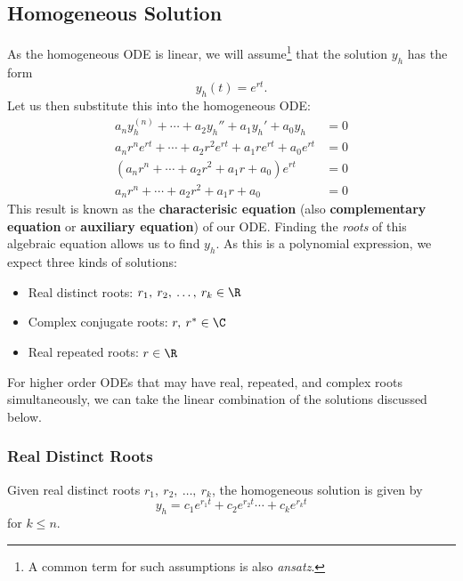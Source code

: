\documentclass{article}
\begin{document}
\subsection{Homogeneous Solution}
As the homogeneous ODE is linear, we will assume\footnote{A common term for such assumptions is also \emph{ansatz}.} that the solution \(y_h\) has the form
\begin{equation*}
    y_h\left( t \right) = e^{r t}.
\end{equation*}
Let us then substitute this into the homogeneous ODE:
\begin{align*}
    a_n y_h^{\left( n \right)} + \cdots + a_2 y_h'' + a_1 y_h' + a_0 y_h     & = 0 \\
    a_n r^n e^{r t} + \cdots + a_2 r^2 e^{r t} + a_1 r e^{r t} + a_0 e^{r t} & = 0 \\
    \left( a_n r^n + \cdots + a_2 r^2 + a_1 r + a_0 \right) e^{r t}          & = 0 \\
    a_n r^n + \cdots + a_2 r^2 + a_1 r + a_0                                 & = 0
\end{align*}
This result is known as the \textbf{characterisic equation} (also \textbf{complementary equation} or \textbf{auxiliary equation}) of our ODE.
Finding the \emph{roots} of this algebraic equation allows us to find \(y_h\).
As this is a polynomial expression, we expect three kinds of solutions:
\begin{itemize}
    \item Real distinct roots: \(r_1,\: r_2,\: \dots,\: r_k \in \R\)
    \item Complex conjugate roots: \(r,\: r^\ast \in \C\)
    \item Real repeated roots: \(r \in \R\)
\end{itemize}
For higher order ODEs that may have real, repeated, and complex roots simultaneously, we can take the linear combination
of the solutions discussed below.
\subsubsection{Real Distinct Roots}
Given real distinct roots \(r_1,\: r_2,\: \dots,\: r_k\), the homogeneous solution is given by
\begin{equation*}
    y_h = c_1 e^{r_1 t} + c_2 e^{r_2 t} \cdots + c_k e^{r_k t}
\end{equation*}
for \(k \leq n\).
\end{document}
